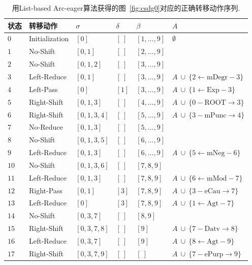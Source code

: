 \begin{table}[thbp]
	\centering
	\small
	\begin{tabular}{C{2em}L{7em}R{4em}C{4em}L{4em}L{9em}}
		\hline
		\bf 状态 & \bf 转移动作 & $\sigma$ & $\delta$ & $\beta$ & $A$ \\
		\hline
		$0$ & Initialization & $[0]$ & $[\ ]$ & $[1, \dots, 9]$ & $\emptyset $ \\
		$1$ & No-Shift & $[0, 1]$ & $[\ ]$ & $[2, \dots, 9]$ &  \\
		$2$ & No-Shift & $[0, 1, 2]$ & $[\ ]$ & $[3, \dots, 9]$ &  \\
		$3$ & Left-Reduce & $[0, 1]$ & $[\ ]$ & $[3, \dots, 9]$ & $A\ \cup\ \{2\leftarrow \textrm{mDegr}-3\}$ \\
		$4$ & Left-Pass & $[0]$ & $[1]$ & $[3, \dots, 9]$ & $A\ \cup\ \{1\leftarrow \textrm{Exp}-3\}$ \\
		$5$ & Right-Shift & $[0, 1, 3]$ & $[\ ]$ & $[4, \dots, 9]$ & $A\ \cup\ \{0- \textrm{ROOT}\rightarrow 3\}$ \\
		$6$ & Right-Shift & $[0, 1, 3, 4]$ & $[\ ]$ & $[5, \dots, 9]$ & $A\ \cup\ \{3- \textrm{mPunc}\rightarrow 4\}$ \\
		$7$ & No-Reduce & $[0, 1, 3]$ & $[\ ]$ & $[5, \dots, 9]$ &  \\
		$8$ & No-Shift & $[0, 1, 3, 5]$ & $[\ ]$ & $[6, \dots, 9]$ &  \\
		$9$ & Left-Reduce & $[0, 1, 3]$ & $[\ ]$ & $[6, \dots, 9]$ & $A\ \cup\ \{5\leftarrow \textrm{mNeg}-6\}$ \\
		$10$ & No-Shift & $[0, 1, 3, 6]$ & $[\ ]$ & $[7, 8, 9]$ &  \\
		$11$ & Left-Reduce & $[0, 1, 3]$ & $[\ ]$ & $[7, 8, 9]$ & $A\ \cup\ \{6\leftarrow \textrm{mMod}-7\}$ \\
		$12$ & Right-Pass & $[0, 1]$ & $[3]$ & $[7, 8, 9]$ & $A\ \cup\ \{3- \textrm{eCau}\rightarrow 7\}$ \\
		$13$ & Left-Reduce & $[0]$ & $[3]$ & $[7, 8, 9]$ & $A\ \cup\ \{1\leftarrow \textrm{Agt}-7\}$ \\
		$14$ & No-Shift & $[0, 3, 7]$ & $[\ ]$ & $[8, 9]$ &  \\
		$15$ & Right-Shift & $[0, 3, 7, 8]$ & $[\ ]$ & $[9]$ & $A\ \cup\ \{7- \textrm{Datv}\rightarrow 8\}$ \\
		$16$ & Left-Reduce & $[0, 3, 7]$ & $[\ ]$ & $[9]$ & $A\ \cup\ \{8\leftarrow \textrm{Agt}-9\}$ \\
		$17$ & Right-Shift & $[0, 3, 7, 9]$ & $[\ ]$ & $[\ ]$ & $A\ \cup\ \{7- \textrm{ePurp}\rightarrow 9\}$ \\
		\hline
	\end{tabular}
	\caption{用List-based Arc-eager算法获得的图~\ref{fig:csdg0}对应的正确转移动作序列.}
	\label{tbl:trans-seq}
	\vspace{-1em}
\end{table}

